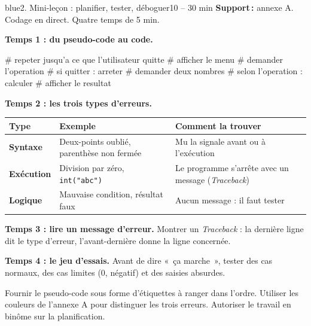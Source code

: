 \documentclass[11pt,a4paper]{article}
\begin{document}
\begin{etape}{blue}{2. Mini-leçon : planifier, tester, déboguer}{10 -- 30 min}
\textbf{Support\,:} annexe A. Codage en direct. Quatre temps de 5 min.

\textbf{Temps 1 : du pseudo-code au code.}
\begin{center}
\end{center}

\begin{python}
# repeter jusqu'a ce que l'utilisateur quitte
#   afficher le menu
#   demander l'operation
#   si quitter : arreter
#   demander deux nombres
#   selon l'operation : calculer
#   afficher le resultat
\end{python}

\textbf{Temps 2 : les trois types d'erreurs.}
\begin{center}
\begin{tabularx}{\linewidth}{>{\bfseries}p{3.2cm}Y Y}
\toprule
Type & Exemple & Comment la trouver\\
\midrule
Syntaxe & Deux-points oublié, parenthèse non fermée & Mu la signale avant ou à l'exécution\\
Exécution & Division par zéro, \texttt{int("abc")} & Le programme s'arrête avec un message (\emph{Traceback})\\
Logique & Mauvaise condition, résultat faux & Aucun message : il faut tester\\
\bottomrule
\end{tabularx}
\end{center}

\textbf{Temps 3 : lire un message d'erreur.} Montrer un \emph{Traceback} : la dernière ligne dit le type d'erreur, l'avant-dernière donne la ligne concernée.

\textbf{Temps 4 : le jeu d'essais.} Avant de dire «~ça marche~», tester des cas normaux, des cas limites (0, négatif) et des saisies absurdes.

\begin{astuce}
Fournir le pseudo-code sous forme d'étiquettes à ranger dans l'ordre. Utiliser les couleurs de l'annexe A pour distinguer les trois erreurs. Autoriser le travail en binôme sur la planification.
\end{astuce}
\end{etape}
\end{document}
